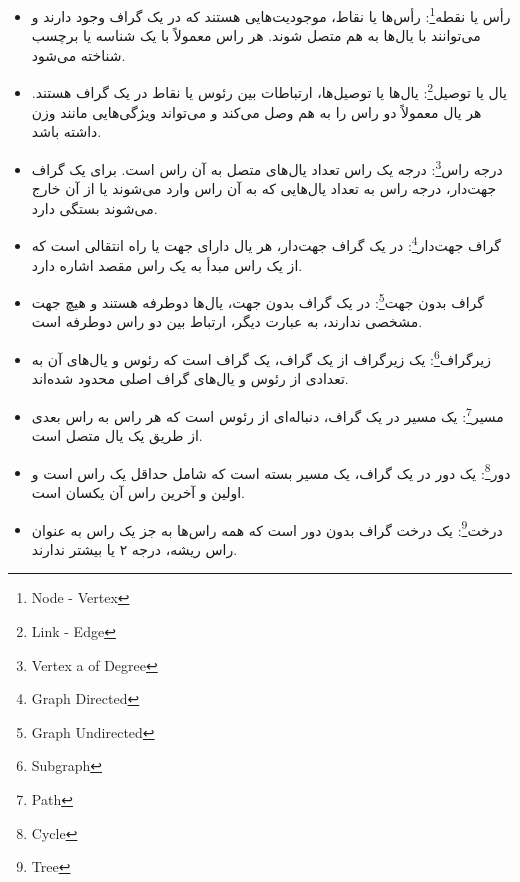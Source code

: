 \documentclass[a4paper,10pt]{book}
\begin{document}
            \begin{itemize}
                
                \item رأس یا نقطه\footnote{\hspace{2pt}Node - Vertex}: رأس‌ها یا نقاط، موجودیت‌هایی هستند که در یک گراف وجود دارند و می‌توانند با یال‌ها به هم متصل شوند. هر راس معمولاً با یک شناسه یا برچسب شناخته می‌شود.

                \item یال یا توصیل\footnote{\hspace{2pt}Link - Edge}: یال‌ها یا توصیل‌ها، ارتباطات بین رئوس یا نقاط در یک گراف هستند. هر یال معمولاً دو راس را به هم وصل می‌کند و می‌تواند ویژگی‌هایی مانند وزن داشته باشد.

                \item درجه راس\footnote{\hspace{2pt}Vertex a of Degree}: درجه یک راس تعداد یال‌های متصل به آن راس است. برای یک گراف جهت‌دار، درجه راس به تعداد یال‌هایی که به آن راس وارد می‌شوند یا از آن خارج می‌شوند بستگی دارد.

                \item گراف جهت‌دار\footnote{\hspace{2pt}Graph Directed}: در یک گراف جهت‌دار، هر یال دارای جهت یا راه انتقالی است که از یک راس مبدأ به یک راس مقصد اشاره دارد.
                
                \item گراف بدون جهت\footnote{\hspace{2pt}Graph Undirected}: در یک گراف بدون جهت، یال‌ها دوطرفه هستند و هیچ جهت مشخصی ندارند، به عبارت دیگر، ارتباط بین دو راس دوطرفه است.

                \item زیرگراف\footnote{\hspace{2pt}Subgraph}: یک زیرگراف از یک گراف، یک گراف است که رئوس و یال‌های آن به تعدادی از رئوس و یال‌های گراف اصلی محدود شده‌اند.

                \item مسیر\footnote{\hspace{2pt}Path}: یک مسیر در یک گراف، دنباله‌ای از رئوس است که هر راس به راس بعدی از طریق یک یال متصل است.
                
                \item دور\footnote{\hspace{2pt}Cycle}: یک دور در یک گراف، یک مسیر بسته است که شامل حداقل یک راس است و اولین و آخرین راس آن یکسان است.
                
                \item درخت\footnote{\hspace{2pt}Tree}: یک درخت گراف بدون دور است که همه راس‌ها به جز یک راس به عنوان راس ریشه، درجه ۲ یا بیشتر ندارند.

            \end{itemize}
\end{document}
